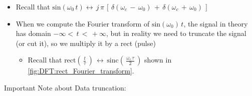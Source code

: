 \begin{itemize}

\item Recall that $\text{sin}(\omega_0 \, t) \leftrightarrow \, j\,\pi \, \left[\, \delta(\omega_c \,- \, \omega_0) \, + \, \delta(\omega_c \,+ \, \omega_0)  \,\right]$

\item When we compute the Fourier transform of $\text{sin}(\omega_0)\, t$, the signal in theory has domain  $-\infty < \, t \, <\, + \infty$, but in reality we need to truncate the signal (or cut it), so we multiply it by a rect (pulse)

	\begin{itemize}
	\item Recall that $\text{rect} \left(\, \displaystyle\frac{t}{\tau} \,\right) \, \leftrightarrow \, \text{sinc} \left(\,\displaystyle\frac{\omega_c \, \tau}{2} \, \right)$ shown in \autoref{fig:DFT:rect_Fourier_transform}.

	\end{itemize}

\end{itemize}

Important Note about Data truncation:

